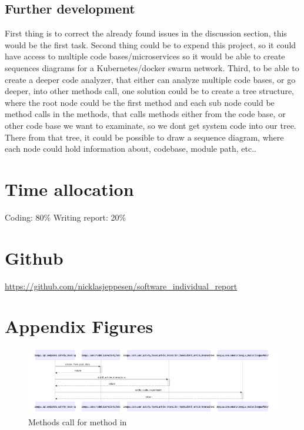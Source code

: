 \documentclass[12pt,a4paper]{report}
\begin{document}
    \section{Further development} 

    First thing is to correct the already found issues in the discussion section, this would be the first task. Second thing could be to expend this project, so it could have access to multiple code bases/microservices so it would be able to create sequences diagrams for a Kubernetes/docker swarm network. Third, to be able to create a deeper code analyzer, that either can analyze multiple code bases, or go deeper, into other methods call, one solution could be to create a tree structure, where the root node could be the first method and each sub node could be method calls in the methods, that calls methods either from the code base, or other code base we want to examinate, so we dont get system code into our tree. There from that tree, it could be possible to draw a sequence diagram, where each node could hold information about, codebase, module path, etc.. 


















    \chapter{Time allocation}

    Coding: 80\% \newline
    Writing report: 20\%


    \chapter{Github}

    \url{https://github.com/nicklasjeppesen/software_individual_report}
    
    \appendix
    \chapter{Appendix Figures}

    \begin{figure}[H]
        \centering
        \includegraphics[scale=0.45]{upload_user_activity_data.png}
        \caption{Methods call for method  in  }
        \label{upload_user_activity}
    \end{figure}
   
\end{document}
